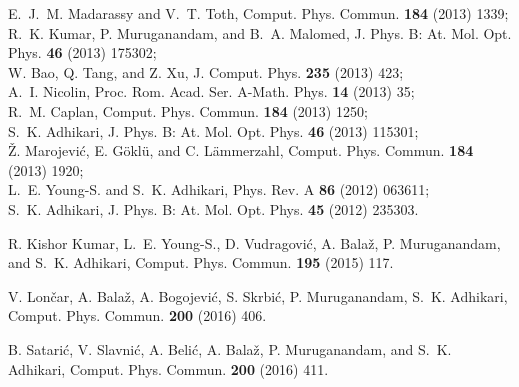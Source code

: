 \documentclass[onecolumn,3p]{elsarticle}
\begin{document}
\begin{thebibliography}{5}
E.~J.~M. Madarassy and V.~T. Toth, Comput. Phys. Commun. {\bf 184} (2013) 1339;\\
R.~K. Kumar, P. Muruganandam, and B.~A. Malomed, J. Phys. B: At. Mol. Opt. Phys. {\bf 46} (2013) 175302;\\
W. Bao, Q. Tang, and Z. Xu, J. Comput. Phys. {\bf 235} (2013) 423;\\
A.~I. Nicolin, Proc. Rom. Acad. Ser. A-Math. Phys. {\bf 14} (2013) 35;\\
R.~M. Caplan, Comput. Phys. Commun. {\bf 184} (2013) 1250;\\
S.~K. Adhikari, J. Phys. B: At. Mol. Opt. Phys. {\bf 46} (2013) 115301;\\
\v{Z}. Marojevi\'{c}, E. G\"{o}kl\"{u}, and C. L\"{a}mmerzahl, Comput. Phys. Commun. {\bf 184} (2013) 1920;\\
L.~E. Young-S. and S.~K. Adhikari, Phys. Rev. A {\bf 86} (2012) 063611;\\
S.~K. Adhikari, J. Phys. B: At. Mol. Opt. Phys. {\bf 45} (2012) 235303.

R. Kishor Kumar, L.~E. Young-S., D. Vudragovi\'{c}, A. Bala\v{z}, P. Muruganandam, and S.~K. Adhikari, Comput. Phys. Commun. {\bf 195} (2015) 117.

V. Lon\v car, A. Bala\v z, A. Bogojevi\'c, S. Skrbi\'c, P. Muruganandam, S.~K. Adhikari, Comput. Phys. Commun. {\bf 200} (2016) 406. 

 B. Satari\'c, V. Slavni\'c, A. Beli\'c, A. Bala\v z, P. Muruganandam, and S.~K. Adhikari, Comput. Phys. Commun. {\bf 200} (2016) 411.

\end{thebibliography}
\end{document}

